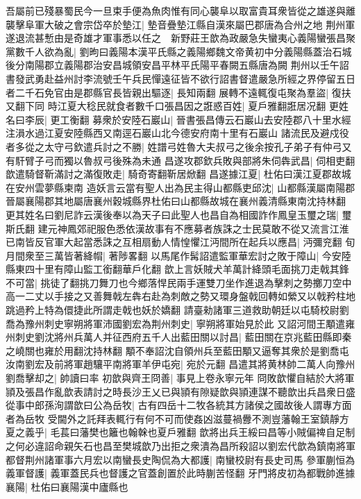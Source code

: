 吾屬前已殘暴蜀民今一旦束手便為魚肉惟有同心襲阜以取富貴耳衆皆從之雄遂與離襲擊阜軍大破之會宗岱卒於墊江|{
	墊音疊墊江縣自漢來屬巴郡唐為合州之地}
荆州軍遂退流甚慙由是奇雄才軍事悉以任之　新野莊王歆為政嚴急失蠻夷心義陽蠻張昌聚黨數千人欲為亂|{
	劉昫曰義陽本漢平氏縣之義陽鄉魏文帝黄初中分義陽縣蓋治石城後分南陽郡立義陽郡治安昌城領安昌平林平氏陽平春闕五縣唐為闕}
荆州以壬午詔書發武勇赴益州討李流號壬午兵民憚遠征皆不欲行詔書督遣嚴急所經之界停留五日者二千石免官由是郡縣官長皆親出驅逐|{
	長知兩翻}
展轉不遠輒復屯聚為羣盜|{
	復扶又翻下同}
時江夏大稔民就食者數千口張昌因之誑惑百姓|{
	夏戶雅翻誑居况翻}
更姓名曰李辰|{
	更工衡翻}
募衆於安陸石巖山|{
	晉書張昌傳云石巖山去安陸郡八十里水經注溳水過江夏安陸縣西又南逕石巖山北今德安府南十里有石巖山}
諸流民及避戍役者多從之太守弓欽遣兵討之不勝|{
	姓譜弓姓魯大夫叔弓之後余按孔子弟子有仲弓又有馯臂子弓而獨以魯叔弓後殊為未通}
昌遂攻郡欽兵敗與部將朱伺犇武昌|{
	伺相吏翻}
歆遣騎督靳滿討之滿復敗走|{
	騎奇寄翻靳居焮翻}
昌遂據江夏|{
	杜佑曰漢江夏郡故城在安州雲夢縣柬南}
造妖言云當有聖人出為民主得山都縣吏邱沈|{
	山都縣漢屬南陽郡晉屬襄陽郡其地屬唐襄州穀城縣界杜佑曰山都縣故城在襄州義清縣東南沈持林翻}
更其姓名曰劉尼詐云漢後奉以為天子曰此聖人也昌自為相國詐作鳳皇玉璽之瑞|{
	璽斯氏翻}
建元神鳳郊祀服色悉依漢故事有不應募者族誅之士民莫敢不從又流言江淮已南皆反官軍大起當悉誅之互相扇動人情惶懼江沔間所在起兵以應昌|{
	沔彌兖翻}
旬月間衆至三萬皆著絳㡌|{
	著陟畧翻}
以馬尾作髯詔遣監軍華宏討之敗于障山|{
	今安陸縣東四十里有障山監工銜翻華戶化翻}
歆上言妖賊犬羊萬計絳頭毛面挑刀走戟其鋒不可當|{
	挑徒了翻挑刀舞刀也今鄉落悍民兩手運雙刀坐作進退為擊刺之勢擲刀空中高一二丈以手接之又善舞戟左犇右赴為刺敵之勢又環身盤戟回轉如縈又以戟矜柱地跳過矜上特為儇捷此所謂走戟也妖於嬌翻}
請臺勑諸軍三道救助朝廷以屯騎校尉劉喬為豫州刺史寧朔將軍沛國劉宏為荆州刺史|{
	寧朔將軍始見於此}
又詔河間王顒遣雍州刺史劉沈將州兵萬人并征西府五千人出藍田關以討昌|{
	藍田關在京兆藍田縣即秦之嶢關也雍於用翻沈持林翻}
顒不奉詔沈自領州兵至藍田顒又逼奪其衆於是劉喬屯汝南劉宏及前將軍趙驤平南將軍羊伊屯宛|{
	宛於元翻}
昌遣其將黄林帥二萬人向豫州劉喬擊却之|{
	帥讀曰率}
初歆與齊王冏善|{
	事見上卷永寧元年}
冏敗歆懼自結於大將軍頴及張昌作亂歆表請討之時長沙王乂已與頴有隙疑歆與頴連謀不聽歆出兵昌衆日盛從事中郎孫洵謂歆曰公為岳牧|{
	古有四岳十二牧各統其方諸侯之國故後人謂專方面者為岳牧}
受閫外之託拜表輒行有何不可而使姦凶滋蔓禍釁不測豈藩翰王室鎮靜方夏之義乎|{
	毛萇曰藩樊也籬也翰榦也夏戶雅翻}
歆將出兵王綏曰昌等小賊偏禆自足制之何必違詔命親矢石也昌至樊城歆乃出拒之衆潰為昌所殺詔以劉宏代歆為鎮南將軍都督荆州諸軍事六月宏以南蠻長史陶侃為大都護|{
	南蠻校尉有長史司馬}
參軍蒯恒為義軍督護|{
	義軍蓋民兵也督護之官蓋創置於此時蒯苦怪翻}
牙門將皮初為都戰帥進據襄陽|{
	杜佑曰襄陽漢中廬縣也}
